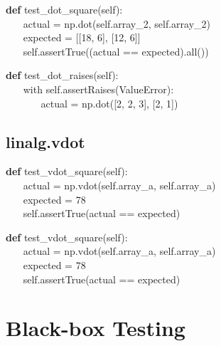 \documentclass[a4paper,11pt]{article}
\begin{document}
\begin{algorithm}[H]
    \textbf{def} test\_dot\_square(self):
\\ $ ~~~~~~~~ $actual = np.dot(self.array\_2, self.array\_2)
\\ $ ~~~~~~~~ $expected = [[18, 6], [12, 6]]
\\ $ ~~~~~~~~ $self.assertTrue((actual == expected).all())
\end{algorithm}

\begin{algorithm}[H]
    \textbf{def} test\_dot\_raises(self):
\\ $ ~~~~~~~~ $with self.assertRaises(ValueError):
\\ $ ~ ~~~~~~~~ ~~~~~~~ $actual = np.dot([2, 2, 3], [2, 1])
\end{algorithm}

\subsection{linalg.vdot}

\begin{algorithm}[H]
    \textbf{def} test\_vdot\_square(self):
\\ $ ~~~~~~~~ $actual = np.vdot(self.array\_a, self.array\_a)
\\ $ ~~~~~~~~ $expected = 78
\\ $ ~~~~~~~~ $self.assertTrue(actual == expected)
\end{algorithm}

\begin{algorithm}[H]
	\textbf{def} test\_vdot\_square(self):
	\\ $ ~~~~~~~~ $actual = np.vdot(self.array\_a, self.array\_a)
	\\ $ ~~~~~~~~ $expected = 78
	\\ $ ~~~~~~~~ $self.assertTrue(actual == expected)
\end{algorithm}



\newpage	
\section{Black-box Testing}
\end{document}
